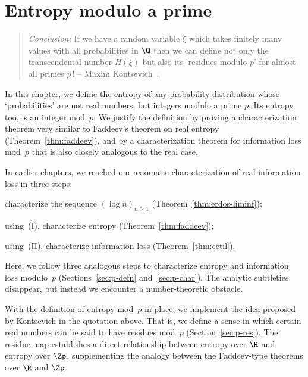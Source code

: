 \chapter{Entropy modulo a prime}


\begin{quote}
\emph{Conclusion:} If we have a random variable $\xi$ which takes
finitely many values with all probabilities in $\Q$ then we can define
not only the transcendental number $H(\xi)$ but also its `residues%
% 
% 
modulo $p$' for almost all primes $p$\,!  \quad%
%
%
\hfill -- Maxim Kontsevich~\cite{KontOHL}.
\end{quote}

\noindent
In this chapter, we define the entropy of any probability distribution
whose `probabilities' are not real numbers, but integers modulo a prime $p$.
Its entropy, too, is an integer mod~$p$.  We justify the definition by
proving a characterization theorem very similar to Faddeev's theorem on
real entropy (Theorem~\ref{thm:faddeev}), and by a characterization theorem
for information loss mod~$p$ that is also closely analogous to the real
case.

In earlier chapters, we reached our axiomatic characterization of real
information loss in three steps:
% 
\begin{list}{}{}
\item[\phantom{(III)}] 
characterize the sequence $(\log n)_{n \geq 1}$
(Theorem~\ref{thm:erdos-liminf});  

\item[\phantom{(III)}] 
using~(I), characterize entropy (Theorem~\ref{thm:faddeev});

\item[\phantom{(III)}] 
using~(II), characterize information loss (Theorem~\ref{thm:cetil}).  
\end{list}
% 
Here, we follow three analogous steps to characterize entropy and
information loss modulo~$p$ (Sections~\ref{sec:p-defn}
and~\ref{sec:p-char}).  The analytic subtleties disappear, but instead we
encounter a number-theoretic obstacle.  

With the definition of entropy mod~$p$ in place, we implement the idea
proposed by Kontsevich in the quotation above.  That is, we define a sense
in which certain real numbers can be said to have residues mod~$p$
(Section~\ref{sec:p-res}).  The residue map establishes a direct
relationship between entropy over $\R$ and entropy over $\Zp$,
supplementing the analogy between the Faddeev-type theorems over $\R$ and
$\Zp$. 

